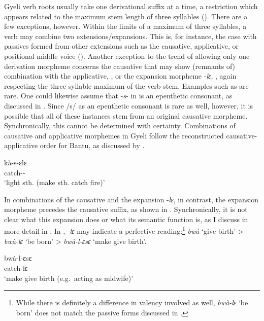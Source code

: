 Gyeli verb roots usually take one derivational suffix at a time, a restriction which appears related to the maximum stem length of three syllables (). There are a few exceptions, however. Within the limits of a maximum of three syllables, a verb may combine two extensions/expansions. This is, for instance, the case with passives formed from other extensions such as the causative, applicative, or positional middle voice (). Another exception to the trend of allowing only one derivation morpheme concerns the causative that may show (remnants of) combination with the applicative, , or the expansion morpheme -{\itshape lɛ}, , again respecting the three syllable maximum of the verb stem. Examples such as  are rare. One could likewise assume that  -{\itshape s}- in  is an epenthetic consonant, as discussed in . Since /s/ as an epenthetic consonant is rare as well, however, it is possible that all of these instances stem from an original causative morpheme. Synchronically, this cannot be determined with certainty. Combinations of causative and applicative morphemes in Gyeli follow the reconstructed causative-applicative order for Bantu, as discussed by \citet{good2005}.


\ea \label{CAUSAPP}
 \gll  kà-s-ɛlɛ  \\
         catch-{\CAUS}-\textsc{\APPL} \\
    \trans `light sth. (make sth. catch fire)'
\z

\noindent In combinations of the causative and the expansion -{\itshape lɛ}, in contrast, the expansion morpheme precedes the causative suffix, as shown in .  Synchronically, it is not clear what this expansion does or what its semantic function is, as I discuss in more detail in . In , -{\itshape lɛ} may indicate a perfective reading:\footnote{While there is definitely a difference in valency involved as well, {\itshape bwà-lɛ} `be born' does not match the passive forms discussed in .} {\itshape bwà} `give birth' >  {\itshape bwà-lɛ} `be born' >  {\itshape bwà-l-ɛsɛ} `make give birth'.

\ea \label{CAUSle}
 \gll  bwà-l-ɛsɛ  \\
         catch-lɛ-{\CAUS} \\
    \trans `make give birth (e.g.\ acting as midwife)'
\z

